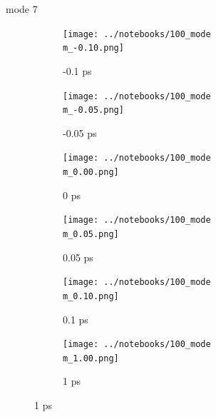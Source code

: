 \documentclass{beamer}
\begin{document}
\renewcommand\m{7}
\begin{frame}{mode \m}
	\begin{figure}
		\centering
		\begin{subfigure}[b]{\w\textwidth}
			\centering
			\texttt{[image: ../notebooks/100\_mode\\m\_-0.10.png]}
			\caption{-0.1 ps}
		\end{subfigure}
		\begin{subfigure}[b]{\w\textwidth}
			\centering
			\texttt{[image: ../notebooks/100\_mode\\m\_-0.05.png]}
			\caption{-0.05 ps}
		\end{subfigure}
		\begin{subfigure}[b]{\w\textwidth}
			\centering
			\texttt{[image: ../notebooks/100\_mode\\m\_0.00.png]}
			\caption{0 ps}
		\end{subfigure}
		\begin{subfigure}[b]{\w\textwidth}
			\centering
			\texttt{[image: ../notebooks/100\_mode\\m\_0.05.png]}
			\caption{0.05 ps}
		\end{subfigure}
		\begin{subfigure}[b]{\w\textwidth}
			\centering
			\texttt{[image: ../notebooks/100\_mode\\m\_0.10.png]}
			\caption{0.1 ps}
		\end{subfigure}
		\begin{subfigure}[b]{\w\textwidth}
			\centering
			\texttt{[image: ../notebooks/100\_mode\\m\_1.00.png]}
			\caption{1 ps}
		\end{subfigure}
	\end{figure}
\end{frame}
\end{document}
